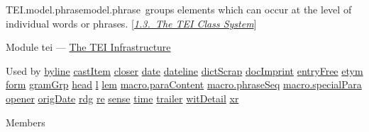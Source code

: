 \begin{reflist}
\item[]\begin{specHead}{TEI.model.phrase}{model.phrase} groups elements which can occur at the level of individual words or phrases. [\textit{\hyperref[STEC]{1.3.\ The TEI Class System}}]\end{specHead} 
    \item[{Module}]
  tei — \hyperref[ST]{The TEI Infrastructure}
    \item[{Used by}]
  \hyperref[TEI.byline]{byline} \hyperref[TEI.castItem]{castItem} \hyperref[TEI.closer]{closer} \hyperref[TEI.date]{date} \hyperref[TEI.dateline]{dateline} \hyperref[TEI.dictScrap]{dictScrap} \hyperref[TEI.docImprint]{docImprint} \hyperref[TEI.entryFree]{entryFree} \hyperref[TEI.etym]{etym} \hyperref[TEI.form]{form} \hyperref[TEI.gramGrp]{gramGrp} \hyperref[TEI.head]{head} \hyperref[TEI.l]{l} \hyperref[TEI.lem]{lem} \hyperref[TEI.macro.paraContent]{macro.paraContent} \hyperref[TEI.macro.phraseSeq]{macro.phraseSeq} \hyperref[TEI.macro.specialPara]{macro.specialPara} \hyperref[TEI.opener]{opener} \hyperref[TEI.origDate]{origDate} \hyperref[TEI.rdg]{rdg} \hyperref[TEI.re]{re} \hyperref[TEI.sense]{sense} \hyperref[TEI.time]{time} \hyperref[TEI.trailer]{trailer} \hyperref[TEI.witDetail]{witDetail} \hyperref[TEI.xr]{xr}
    \item[{Members}]

\end{reflist}
